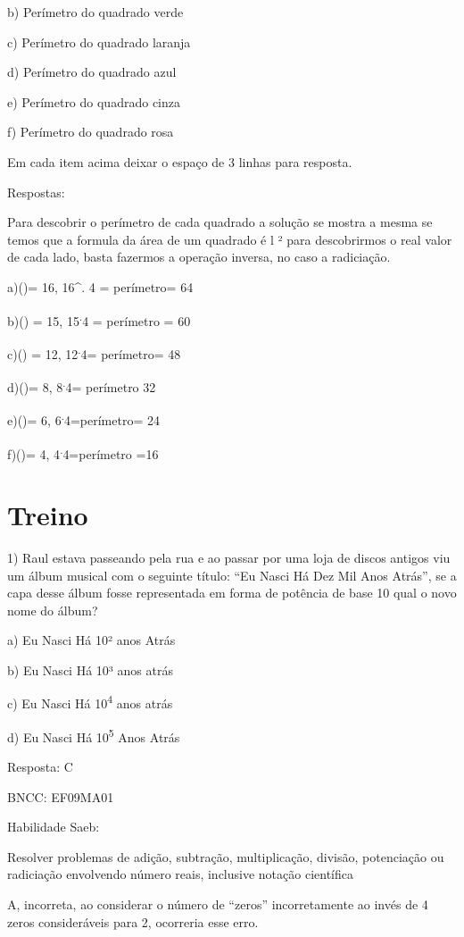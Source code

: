 b) Perímetro do quadrado verde

c) Perímetro do quadrado laranja

d) Perímetro do quadrado azul

e) Perímetro do quadrado cinza

f) Perímetro do quadrado rosa

Em cada item acima deixar o espaço de 3 linhas para resposta.

Respostas:

Para descobrir o perímetro de cada quadrado a solução se mostra a mesma
se temos que a formula da área de um quadrado é l ² para descobrirmos o
real valor de cada lado, basta fazermos a operação inversa, no caso a
radiciação.

a)()= 16, 16^{.} 4 = perímetro= 64

b)() = 15, 15\textsuperscript{.}4 = perímetro = 60

c)() = 12, 12\textsuperscript{.}4= perímetro= 48

d)()= 8, 8\textsuperscript{.}4= perímetro 32

e)()= 6, 6\textsuperscript{.}4=perímetro= 24

f)()= 4, 4\textsuperscript{.}4=perímetro =16

\section{Treino}

1) Raul estava passeando pela rua e ao passar por uma loja de discos
antigos viu um álbum musical com o seguinte título: ``Eu Nasci Há Dez
Mil Anos Atrás'', se a capa desse álbum fosse representada em forma de
potência de base 10 qual o novo nome do álbum?

a) Eu Nasci Há 10² anos Atrás

b) Eu Nasci Há 10³ anos atrás

c) Eu Nasci Há 10\textsuperscript{4} anos atrás

d) Eu Nasci Há 10\textsuperscript{5} Anos Atrás

Resposta: C

BNCC: EF09MA01

Habilidade Saeb:

Resolver problemas de adição, subtração, multiplicação, divisão,
potenciação ou radiciação envolvendo número reais, inclusive notação
científica

A, incorreta, ao considerar o número de ``zeros'' incorretamente ao
invés de 4 zeros consideráveis para 2, ocorreria esse erro.

